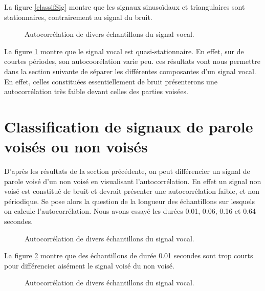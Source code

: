 \documentclass[french]{article}
\begin{document}
La figure \ref{classifSig} montre que les signaux sinusoïdaux et triangulaires sont stationnaires, contrairement au signal du bruit.

\begin{figure}[h!]
\centering

\caption{Autocorrélation de divers échantillons du signal vocal.}
\label{classifAh}
\end{figure}

La figure \ref{classifAh} montre que le signal vocal est quasi-stationnaire. En effet, sur de courtes périodes, son autocoorélation varie peu. ces résultats vont nous permettre dans la section suivante de séparer les différentes composantes d'un signal vocal. En effet, celles constituées essentiellement de bruit présenterons une autocorrélation très faible devant celles des parties voisées.

\FloatBarrier

\section{ Classification de signaux de parole voisés ou non voisés}

\label{sect:autocorr_voise}

D'après les résultats de la section précédente, on peut différencier un signal de parole voisé d'un non voisé en visualisant l'autocorrélation. En effet un signal non voisé est constitué de bruit et devrait présenter une autocorrélation faible, et non périodique. Se pose alors la question de la longueur des échantillons sur lesquels on calcule l'autocorrélation. Nous avons essayé les durées 0.01, 0.06, 0.16 et 0.64 secondes.

\begin{figure}[h!]
\centering

\caption{Autocorrélation de divers échantillons du signal vocal.}
\label{classif1}
\end{figure}

La figure \ref{classif1} montre que des échantillons de durée 0.01 secondes sont trop courts pour différencier aisément le signal voisé du non voisé.

\begin{figure}[h!]
\centering

\caption{Autocorrélation de divers échantillons du signal vocal.}
\label{classif4}
\end{figure}
\end{document}
